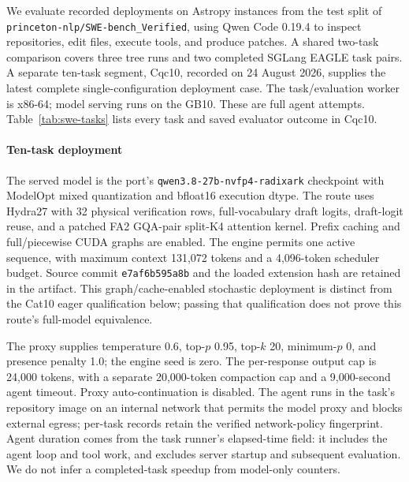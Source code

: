 We evaluate recorded deployments on Astropy instances from the test split of \texttt{princeton-nlp/SWE-bench\_Verified}, using Qwen Code 0.19.4 to inspect repositories, edit files, execute tools, and produce patches. A shared two-task comparison covers three tree runs and two completed SGLang EAGLE task pairs. A separate ten-task segment, Cqc10, recorded on 24 August 2026, supplies the latest complete single-configuration deployment case. The task/evaluation worker is x86-64; model serving runs on the GB10. These are full agent attempts. Table~\ref{tab:swe-tasks} lists every task and saved evaluator outcome in Cqc10.

\paragraph{Ten-task deployment}
The served model is the port's \texttt{qwen3.8-27b-nvfp4-radixark} checkpoint with ModelOpt mixed quantization and bfloat16 execution dtype. The route uses Hydra27 with 32 physical verification rows, full-vocabulary draft logits, draft-logit reuse, and a patched FA2 GQA-pair split-K4 attention kernel. Prefix caching and full/piecewise CUDA graphs are enabled. The engine permits one active sequence, with maximum context 131,072 tokens and a 4,096-token scheduler budget. Source commit \texttt{e7af6b595a8b} and the loaded extension hash are retained in the artifact. This graph/cache-enabled stochastic deployment is distinct from the Cat10 eager qualification below; passing that qualification does not prove this route's full-model equivalence.

The proxy supplies temperature 0.6, top-$p$ 0.95, top-$k$ 20, minimum-$p$ 0, and presence penalty 1.0; the engine seed is zero. The per-response output cap is 24,000 tokens, with a separate 20,000-token compaction cap and a 9,000-second agent timeout. Proxy auto-continuation is disabled. The agent runs in the task's repository image on an internal network that permits the model proxy and blocks external egress; per-task records retain the verified network-policy fingerprint. Agent duration comes from the task runner's elapsed-time field: it includes the agent loop and tool work, and excludes server startup and subsequent evaluation. We do not infer a completed-task speedup from model-only counters.

